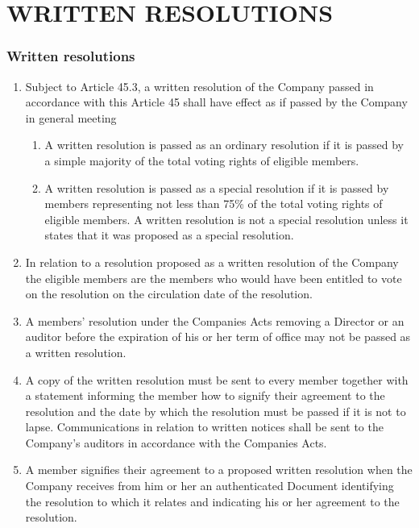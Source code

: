 \documentclass[a4paper,12pt]{article}
\begin{document}
\part*{WRITTEN RESOLUTIONS}

\section{Written resolutions}

\begin{enumerate}
  \item Subject to Article 45.3, a written resolution of the Company passed in accordance with this Article 45 shall have effect as if passed by the Company in general meeting
  \begin{enumerate}
    \item A written resolution is passed as an ordinary resolution if it is passed by a simple majority of the total voting rights of eligible members.
    \item A written resolution is passed as a special resolution if it is passed by members representing not less than 75\% of the total voting rights of eligible members. A written resolution is not a special resolution unless it states that it was proposed as a special resolution.
  \end{enumerate}
  \item In relation to a resolution proposed as a written resolution of the Company the eligible members are the members who would have been entitled to vote on the resolution on the circulation date of the resolution.
  \item A members’ resolution under the Companies Acts removing a Director or an auditor before the expiration of his or her term of office may not be passed as a written resolution.
  \item A copy of the written resolution must be sent to every member together with a statement informing the member how to signify their agreement to the resolution and the date by which the resolution must be passed if it is not to lapse.  Communications in relation to written notices shall be sent to the Company’s auditors in accordance with the Companies Acts.
  \item A member signifies their agreement to a proposed written resolution when the Company receives from him or her an authenticated Document identifying the resolution to which it relates and indicating his or her agreement to the resolution.
  \begin{enumerate}

\end{enumerate}
\end{enumerate}
\end{document}
